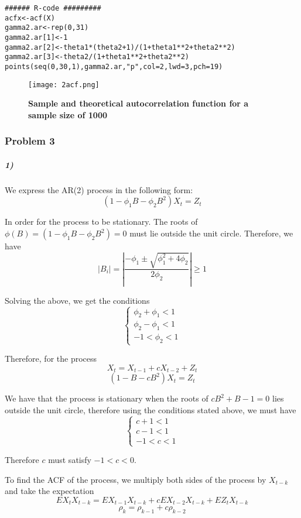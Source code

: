 \documentclass{article}
\begin{document}
\begin{verbatim}
###### R-code #########
acfx<-acf(X)
gamma2.ar<-rep(0,31)
gamma2.ar[1]<-1
gamma2.ar[2]<-theta1*(theta2+1)/(1+theta1**2+theta2**2)
gamma2.ar[3]<-theta2/(1+theta1**2+theta2**2)
points(seq(0,30,1),gamma2.ar,"p",col=2,lwd=3,pch=19)
\end{verbatim}


\begin{figure}[H]
	\centering
  	\texttt{[image: 2acf.png]}
  	\caption{\textbf{Sample and theoretical autocorrelation function for a sample size of 1000} }
\end{figure}

\subsubsection*{Problem 3}


\subparagraph*{1)}

We express the AR(2) process in the following form:
\[
(1-\phi_{1}B-\phi_{2}B^{2})X_{t}=Z_{t}
\]


In order for the process to be stationary. The roots of $\phi(B)=(1-\phi_{1}B-\phi_{2}B^{2})=0$
must lie outside the unit circle. Therefore, we have
\[
|B_{i}|=|\frac{-\phi_{1}\pm\sqrt{\phi_{1}^{2}+4\phi_{2}}}{2\phi_{2}}|\geq1
\]


Solving the above, we get the conditions
\[
\begin{cases}
\phi_{2}+\phi_{1}<1\\
\phi_{2}-\phi_{1}<1\\
-1<\phi_{2}<1
\end{cases}
\]


Therefore, for the process
\[
X_{t}=X_{t-1}+cX_{t-2}+Z_{t}
\]
\[
(1-B-cB^{2})X_{t}=Z_{t}
\]


We have that the process is stationary when the roots of $cB^{2}+B-1=0$
lies outside the unit circle, therefore using the conditions stated
above, we must have
\[
\begin{cases}
c+1<1\\
c-1<1\\
-1<c<1
\end{cases}
\]


Therefore $c$ must satisfy $-1<c<0$.

To find the ACF of the process, we multiply both sides of the process
by $X_{t-k}$ and take the expectation
\[
EX_{t}X_{t-k}=EX_{t-1}X_{t-k}+cEX_{t-2}X_{t-k}+EZ_{t}X_{t-k}
\]
\[
\rho_{k}=\rho_{k-1}+c\rho_{k-2}
\]
\end{document}
